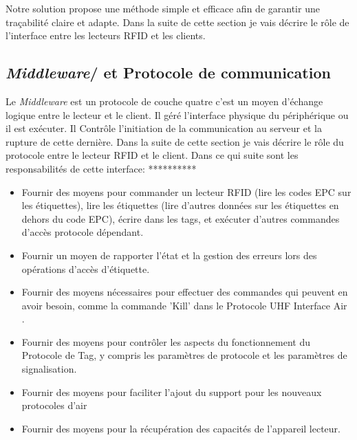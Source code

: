\documentclass[11pt, a4paper, twoside]{book}
\begin{document}
Notre solution propose une méthode simple et efficace afin de garantir une traçabilité claire et adapte. Dans la suite de cette section je vais décrire le rôle de l'interface entre les lecteurs RFID et les clients.
\subsection{\emph{Middleware}/ et Protocole de communication}
Le \emph{Middleware} est un protocole de couche quatre  c'est un moyen d'échange logique entre le lecteur et le client. Il géré l'interface physique du périphérique ou il est exécuter. Il Contrôle l'initiation de la communication au serveur et la rupture de cette dernière. Dans la suite de cette section je vais décrire le rôle du protocole entre le lecteur RFID et le client. Dans ce qui suite sont les responsabilités de cette interface:
**********
\begin{itemize}
\item Fournir des moyens pour commander un lecteur RFID  (lire les codes EPC sur les étiquettes), lire les étiquettes (lire d'autres données sur les étiquettes en dehors du code EPC), écrire dans les tags, et exécuter d'autres commandes d'accès protocole dépendant.
\item 
Fournir un moyen de rapporter l'état et la gestion des erreurs lors des opérations d'accès d'étiquette.
\item 
Fournir des moyens  nécessaires pour effectuer des commandes qui peuvent en avoir besoin, comme la commande 'Kill' dans le Protocole UHF Interface Air \cite{air}.
\item 
Fournir des moyens pour contrôler les aspects du fonctionnement du Protocole de Tag, y compris les paramètres de protocole et les paramètres de signalisation.
\item 
Fournir des moyens pour faciliter l'ajout du support pour les nouveaux protocoles d'air
\item 
Fournir des moyens pour la récupération des capacités de l'appareil lecteur.\\
\end{itemize}
\end{document}
